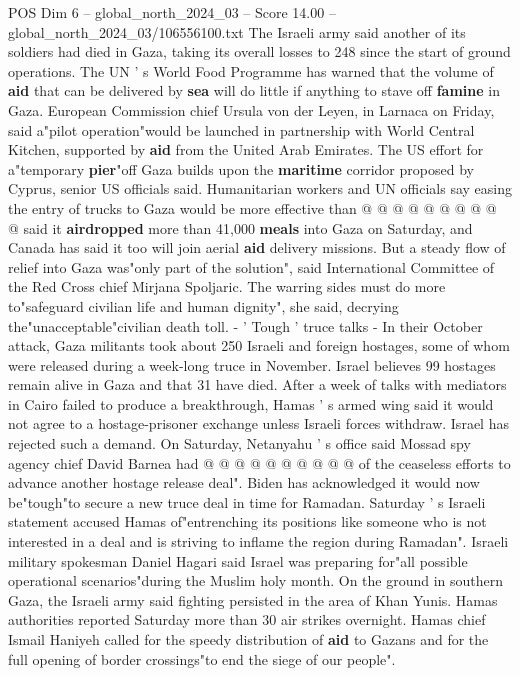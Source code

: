\begin{textsample}{POS Dim 6 – global\_north\_2024\_03 – Score 14.00 – global\_north\_2024\_03/106556100.txt}
The Israeli army said another of its soldiers had died in Gaza, taking its overall losses to 248 since the start of ground operations.
The UN ' s World Food Programme has warned that the volume of \textbf{aid} that can be delivered by \textbf{sea} will do little if anything to stave off \textbf{famine} in Gaza.
European Commission chief Ursula von der Leyen, in Larnaca on Friday, said a"pilot operation"would be launched in partnership with World Central Kitchen, supported by \textbf{aid} from the United Arab Emirates.
The US effort for a"temporary \textbf{pier}"off Gaza builds upon the \textbf{maritime} corridor proposed by Cyprus, senior US officials said.
Humanitarian workers and UN officials say easing the entry of trucks to Gaza would be more effective than @ @ @ @ @ @ @ @ @ @ said it \textbf{airdropped} more than 41,000 \textbf{meals} into Gaza on Saturday, and Canada has said it too will join aerial \textbf{aid} delivery missions.
But a steady flow of relief into Gaza was"only part of the solution", said International Committee of the Red Cross chief Mirjana Spoljaric.
The warring sides must do more to"safeguard civilian life and human dignity", she said, decrying the"unacceptable"civilian death toll. - ' Tough ' truce talks - In their October attack, Gaza militants took about 250 Israeli and foreign hostages, some of whom were released during a week-long truce in November.
Israel believes 99 hostages remain alive in Gaza and that 31 have died.
After a week of talks with mediators in Cairo failed to produce a breakthrough, Hamas ' s armed wing said it would not agree to a hostage-prisoner exchange unless Israeli forces withdraw.
Israel has rejected such a demand.
On Saturday, Netanyahu ' s office said Mossad spy agency chief David Barnea had @ @ @ @ @ @ @ @ @ @ of the ceaseless efforts to advance another hostage release deal".
Biden has acknowledged it would now be"tough"to secure a new truce deal in time for Ramadan.
Saturday ' s Israeli statement accused Hamas of"entrenching its positions like someone who is not interested in a deal and is striving to inflame the region during Ramadan".
Israeli military spokesman Daniel Hagari said Israel was preparing for"all possible operational scenarios"during the Muslim holy month.
On the ground in southern Gaza, the Israeli army said fighting persisted in the area of Khan Yunis.
Hamas authorities reported Saturday more than 30 air strikes overnight.
Hamas chief Ismail Haniyeh called for the speedy distribution of \textbf{aid} to Gazans and for the full opening of border crossings"to end the siege of our people".

\end{textsample}
